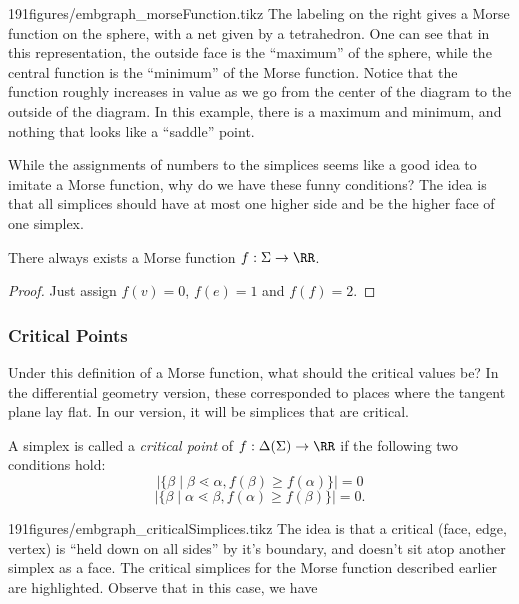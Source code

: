 \begin{examplefigureenv}{191figures/embgraph_morseFunction.tikz}
	The labeling on the right gives a Morse function on the sphere, with a net given by a tetrahedron. One can see that in this representation, the outside face is the ``maximum'' of the sphere, while the central function is the ``minimum'' of the Morse function. Notice that the function roughly increases in value as we go from the center of the diagram to the outside of the diagram. In this example, there is a maximum and minimum, and nothing that looks like a ``saddle'' point. 
\end{examplefigureenv}
While the assignments of numbers to the simplices seems like a good idea to imitate a Morse function,  why do we have these funny conditions?  The idea is that all simplices should have at most one higher side and be the higher face of one simplex. \\
\begin{claim}
	There always exists a Morse function $f: \Sigma\to \RR$.
\end{claim}
\begin{proof}
	Just assign $f(v)=0$, $f(e)=1$ and $f(f)=2$. 
\end{proof}
\subsubsection{Critical Points}
Under this definition of a Morse function,  what should the critical values be? In the differential geometry version,  these corresponded to places where the tangent plane lay flat. In our version,  it will be simplices that are critical. 

\begin{definition}
	A simplex is called a \emph{critical point} of $f: \Delta(\Sigma)\to \RR$ if the following two conditions hold:
	\[|\{\beta \;|\; \beta\lessdot \alpha ,  f(\beta)\geq f(\alpha)\}|=0\]
\[|\{\beta \;|\; \alpha\lessdot \beta ,  f(\alpha)\geq f(\beta)\}|=0.\]
\end{definition}

\begin{paragraphfigureenv}{191figures/embgraph_criticalSimplices.tikz}
The idea is that a critical (face, edge, vertex) is ``held down on all sides'' by it's boundary,  and doesn't sit atop another simplex as a face. The critical simplices for the Morse function described earlier are highlighted. Observe that in this case, we have  
\end{paragraphfigureenv}

